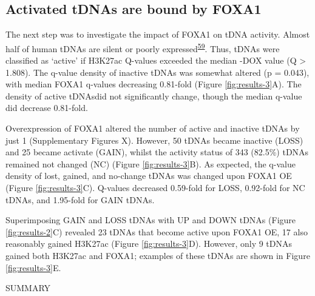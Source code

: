 \documentclass[
  12pt,
]{article}
\begin{document}
\hypertarget{activated-tdnas-are-bound-by-foxa1}{%
\subsection{Activated tDNAs are bound by FOXA1}\label{activated-tdnas-are-bound-by-foxa1}}

The next step was to investigate the impact of FOXA1 on tDNA activity.
Almost half of human tDNAs are silent or poorly expressed\textsuperscript{\protect\hyperlink{ref-Torres2019}{59}}.
Thus, tDNAs were classified as `active' if H3K27ac Q-values exceeded the median -DOX value (Q \textgreater{} 1.808).
The q-value density of inactive tDNAs was somewhat altered (p = 0.043), with median FOXA1 q-values decreasing 0.81-fold (Figure \ref{fig:results-3}A).
The density of active tDNAsdid not significantly change, though the median q-value did decrease 0.81-fold.

Overexpression of FOXA1 altered the number of active and inactive tDNAs by just 1 (Supplementary Figures X).
However, 50 tDNAs became inactive (LOSS) and 25 became activate (GAIN), whilst the activity status of 343 (82.5\%) tDNAs remained not changed (NC) (Figure \ref{fig:results-3}B).
As expected, the q-value density of lost, gained, and no-change tDNAs was changed upon FOXA1 OE (Figure \ref{fig:results-3}C).
Q-values decreased 0.59-fold for LOSS, 0.92-fold for NC tDNAs, and 1.95-fold for GAIN tDNAs.

Superimposing GAIN and LOSS tDNAs with UP and DOWN tDNAs (Figure \ref{fig:results-2}C) revealed 23 tDNAs that become active upon FOXA1 OE, 17 also reasonably gained H3K27ac (Figure \ref{fig:results-3}D).
However, only 9 tDNAs gained both H3K27ac and FOXA1; examples of these tDNAs are shown in Figure \ref{fig:results-3}E.

SUMMARY
\end{document}
